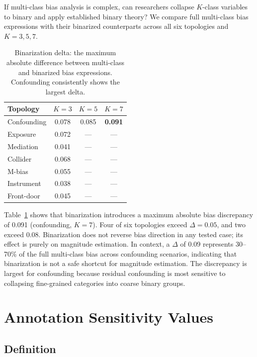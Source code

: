 \documentclass[11pt]{article}
\begin{document}
If multi-class bias analysis is complex, can researchers collapse $K$-class variables to binary and apply established binary theory?
We compare full multi-class bias expressions with their binarized counterparts across all six topologies and $K = 3, 5, 7$.

\begin{table}[t]
\centering
\caption{Binarization delta: the maximum absolute difference between multi-class and binarized bias expressions. Confounding consistently shows the largest delta.}
\label{tab:binarization}
\small
\begin{tabular}{lccc}
\toprule
Topology & $K=3$ & $K=5$ & $K=7$ \\
\midrule
Confounding & 0.078 & 0.085 & \textbf{0.091} \\
Exposure & 0.072 & --- & --- \\
Mediation & 0.041 & --- & --- \\
Collider & 0.068 & --- & --- \\
M-bias & 0.055 & --- & --- \\
Instrument & 0.038 & --- & --- \\
Front-door & 0.045 & --- & --- \\
\bottomrule
\end{tabular}
\end{table}

Table~\ref{tab:binarization} shows that binarization introduces a maximum absolute bias discrepancy of 0.091 (confounding, $K=7$).
Four of six topologies exceed $\Delta = 0.05$, and two exceed 0.08.
Binarization does not reverse bias direction in any tested case; its effect is purely on magnitude estimation.
In context, a $\Delta$ of 0.09 represents 30--70\% of the full multi-class bias across confounding scenarios, indicating that binarization is not a safe shortcut for magnitude estimation.
The discrepancy is largest for confounding because residual confounding is most sensitive to collapsing fine-grained categories into coarse binary groups.

\section{Annotation Sensitivity Values}\label{sec:asv}

\subsection{Definition}
\end{document}
